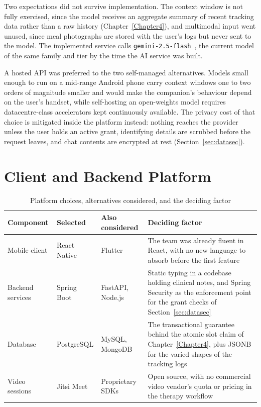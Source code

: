 Two expectations did not survive implementation. The context window is not fully exercised, since the model receives an aggregate summary of recent tracking data rather than a raw history (Chapter~\ref{Chapter4}), and multimodal input went unused, since meal photographs are stored with the user's logs but never sent to the model. The implemented service calls \texttt{gemini-2.5-flash}~\cite{2024-Gemini-TechReport}, the current model of the same family and tier by the time the AI service was built.

A hosted API was preferred to the two self-managed alternatives. Models small enough to run on a mid-range Android phone carry context windows one to two orders of magnitude smaller and would make the companion's behaviour depend on the user's handset, while self-hosting an open-weights model requires datacentre-class accelerators kept continuously available. The privacy cost of that choice is mitigated inside the platform instead: nothing reaches the provider unless the user holds an active grant, identifying details are scrubbed before the request leaves, and chat contents are encrypted at rest (Section~\ref{sec:datasec}).

\section{Client and Backend Platform}

\begin{table}[htbp]
  \centering
  \small
  \caption{Platform choices, alternatives considered, and the deciding factor}
  \label{tab:stack-selection}
  \begin{tabular}{|L{2.4cm}|L{2.9cm}|L{2.5cm}|L{5.6cm}|}
    \hline
    \textbf{Component} & \textbf{Selected} & \textbf{Also considered} & \textbf{Deciding factor} \\
    \hline
    Mobile client & React Native & Flutter & The team was already fluent in React, with no new language to absorb before the first feature \\
    \hline
    Backend services & Spring Boot~\cite{SpringBoot} & FastAPI, Node.js & Static typing in a codebase holding clinical notes, and Spring Security as the enforcement point for the grant checks of Section~\ref{sec:datasec} \\
    \hline
    Database & PostgreSQL & MySQL, MongoDB & The transactional guarantee behind the atomic slot claim of Chapter~\ref{Chapter4}, plus JSONB for the varied shapes of the tracking logs \\
    \hline
    Video sessions & Jitsi Meet~\cite{Jitsi} & Proprietary SDKs & Open source, with no commercial video vendor's quota or pricing in the therapy workflow \\
    \hline
  \end{tabular}
\end{table}
